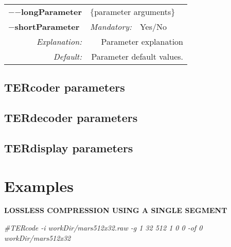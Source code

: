 \documentclass[a4paper,10pt]{article}
\begin{document}
\begin{center}\begin{tabular}{|rr|rlrl|}
	 \hline
	 \multicolumn{2}{|l|}{\textbf{$-$$-$longParameter}} &
	 \multicolumn{4}{|l|}{$\{$parameter arguments$\}$} \\
	 \cline{3-6}
	 \multicolumn{2}{|l|}{\textbf{$-$shortParameter}} & \emph{Mandatory:} & Yes/No & &  \\
	 \hline
	 \emph{Explanation:} & \multicolumn{5}{|p{12cm}|}{Parameter explanation} \\
	 \hline
	 \emph{Default:} & \multicolumn{5}{|p{12cm}|}{Parameter default values.} \\
	 \hline
\end{tabular}\end{center}

\subsection{TERcoder parameters}
\label{sect:encoderParameters}



\newpage

\subsection{TERdecoder parameters}
\label{sect:decoderParameters}



\newpage

\subsection{TERdisplay parameters}
\label{sect:displayParameters}



\newpage
\section{Examples}
\label{sect:examples}

\vspace{0.25cm}\textbf{LOSSLESS COMPRESSION USING A SINGLE SEGMENT}\vspace{0.25cm}  

\emph{\#TERcode -i workDir/mars512x32.raw -g 1 32 512 1 0 0 -of 0
  workDir/mars512x32} \\
\end{document}
